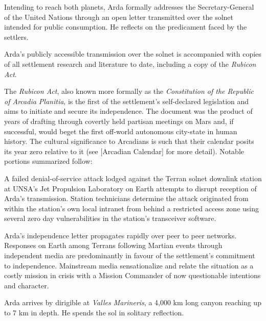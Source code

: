 
Intending to reach both planets, Arda formally addresses the Secretary-General of the United Nations through an open letter transmitted over the solnet intended for public consumption. He reflects on the predicament faced by the settlers.

\startTimelineCorrespondenceDocument
    
\stopTimelineCorrespondenceDocument

Arda's publicly accessible transmission over the solnet is accompanied with copies of all settlement research and literature to date, including a copy of the {\it Rubicon Act}. 

The {\it Rubicon Act}, also known more formally as the {\it Constitution of the Republic of Arcadia Planitia}, is the first of the settlement's self-declared legislation and aims to initiate and secure its independence. The document was the product of years of drafting through covertly held partisan meetings on Mars and, if successful, would beget the first off-world autonomous city-state in human history. The cultural significance to Arcadians is such that their calendar posits its year zero relative to it (see [Arcadian Calendar] for more detail). Notable portions summarized follow:

\startTimelineGeneralDocument
    
\stopTimelineGeneralDocument

A failed denial-of-service attack lodged against the Terran solnet downlink station at UNSA's Jet Propulsion Laboratory on Earth attempts to disrupt reception of Arda's transmission. Station technicians determine the attack originated from within the station's own local intranet from behind a restricted access zone using several zero day vulnerabilities in the station's transceiver software.

Arda's independence letter propagates rapidly over peer to peer networks. Responses on Earth among Terrans following Martian events through independent media are predominantly in favour of the settlement's commitment to independence. Mainstream media sensationalize and relate the situation as a costly mission in crisis with a Mission Commander of now questionable intentions and character.
\StopTimelineDate

Arda arrives by dirigible at {\it Valles Marineris}, a 4,000 km long canyon reaching up to 7 km in depth. He spends the sol in solitary reflection.

